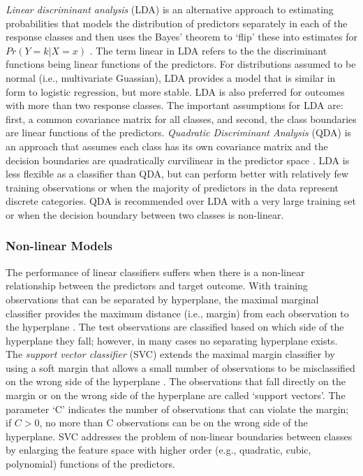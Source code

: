\documentclass[sigconf]{acmart}
\begin{document}
\emph{Linear discriminant analysis} (LDA) is an alternative approach to 
estimating probabilities that models the distribution of predictors 
separately in each of the response classes and then uses the Bayes' theorem 
to `flip' these into estimates for $Pr(Y=k | X=x)$ \cite{james13}. The term 
linear in LDA refers to the the discriminant functions being linear functions 
of the predictors. For distributions assumed to be normal (i.e., multivariate 
Guassian), LDA provides a model that is similar in form to logistic regression, 
but more stable. LDA is also preferred for outcomes with more than two response 
classes. The important assumptions for LDA are: first, a common covariance 
matrix for all classes, and second, the class boundaries are linear functions 
of the predictors. \emph{Quadratic Discriminant Analysis} (QDA) is an approach 
that assumes each class has its own covariance matrix and the decision 
boundaries are quadratically curvilinear in the predictor space \cite{kuhn13}. 
LDA is less flexible as a classifier than QDA, but can perform better with 
relatively few training observations or when the majority of predictors in the 
data represent discrete categories. QDA is recommended over LDA with a very 
large training set or when the decision boundary between two classes is 
non-linear. 


\subsubsection{Non-linear Models}

The performance of linear classifiers suffers when there is a non-linear 
relationship between the predictors and target outcome. With training
observations that can be separated by hyperplane, the maximal marginal 
classifier provides the maximum distance (i.e., margin) from each observation
to the hyperplane \cite{james13}. The test observations are classified based 
on which side of the hyperplane they fall; however, in many cases no separating 
hyperplane exists. The \emph{support vector classifier} (SVC) extends the 
maximal margin classifier by using a soft margin that allows a small number 
of observations to be misclassified on the wrong side of the hyperplane 
\cite{kuhn13, cortes95}. The observations that fall directly on the margin or 
on the wrong side of the hyperplane are called `support vectors'. The parameter 
`C' indicates the number of observations that can violate the margin; if $C>0$, 
no more than C observations can be on the wrong side of the hyperplane. 
SVC addresses the problem of non-linear boundaries between classes by 
enlarging the feature space with higher order (e.g., quadratic, cubic, 
polynomial) functions of the predictors. 
\end{document}
